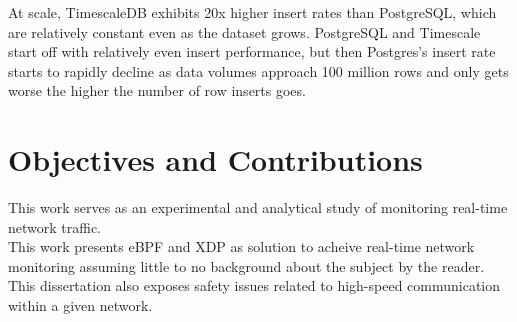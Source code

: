 At scale, TimescaleDB exhibits 20x higher insert rates than PostgreSQL, which are relatively constant even as the dataset grows.
PostgreSQL and Timescale start off with relatively even insert performance, but then Postgres's insert rate 
starts to rapidly decline as data volumes approach 100 million rows and only gets worse the higher
the number of row inserts goes.\\

\section{Objectives and Contributions}

This work serves as an experimental and analytical study of monitoring real-time network traffic.\\
This work presents eBPF and XDP as solution to acheive real-time network monitoring assuming little to no background about the subject by the reader.
This dissertation also exposes safety issues related to high-speed communication within a given network.\\
